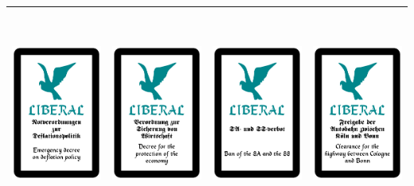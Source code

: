 \documentclass[12pt,a4paper,spanish]{article}
\begin{document}
\begin{table}
\begin{tabular}{|c|c|c|c|}
			\midrule
			\includegraphics[height=6.85cm]{./Drawings/liberal2.pdf} &
			\includegraphics[height=6.85cm]{./Drawings/liberal3.pdf} &
			\includegraphics[height=6.85cm]{./Drawings/liberal4.pdf} &
			\includegraphics[height=6.85cm]{./Drawings/liberal5.pdf} \\
			\bottomrule
		\end{tabular}
	\end{table}
	
\end{document}
